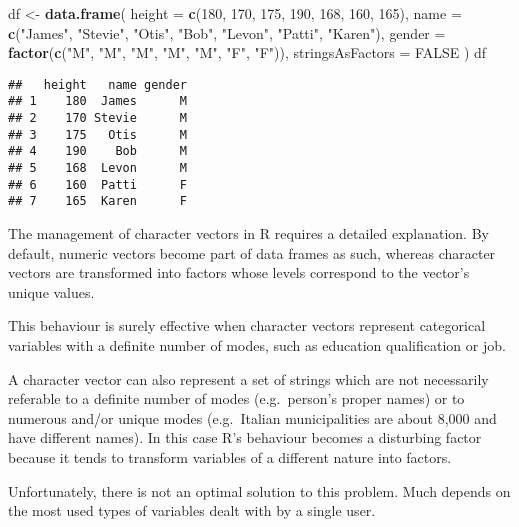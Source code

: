 \documentclass[]{book}
\newenvironment{Shaded}{\begin{snugshade}}{\end{snugshade}}
\newcommand{\KeywordTok}[1]{\textcolor[rgb]{0.13,0.29,0.53}{\textbf{{#1}}}}
\newcommand{\DataTypeTok}[1]{\textcolor[rgb]{0.13,0.29,0.53}{{#1}}}
\newcommand{\DecValTok}[1]{\textcolor[rgb]{0.00,0.00,0.81}{{#1}}}
\newcommand{\StringTok}[1]{\textcolor[rgb]{0.31,0.60,0.02}{{#1}}}
\newcommand{\OtherTok}[1]{\textcolor[rgb]{0.56,0.35,0.01}{{#1}}}
\newcommand{\NormalTok}[1]{{#1}}
\begin{document}
\begin{Shaded}
\begin{Highlighting}[]
\NormalTok{df <-}\StringTok{ }\KeywordTok{data.frame}\NormalTok{(}
  \DataTypeTok{height =} \KeywordTok{c}\NormalTok{(}\DecValTok{180}\NormalTok{, }\DecValTok{170}\NormalTok{, }\DecValTok{175}\NormalTok{, }\DecValTok{190}\NormalTok{, }\DecValTok{168}\NormalTok{, }\DecValTok{160}\NormalTok{, }\DecValTok{165}\NormalTok{),}
  \DataTypeTok{name =} \KeywordTok{c}\NormalTok{(}\StringTok{"James"}\NormalTok{, }\StringTok{"Stevie"}\NormalTok{, }\StringTok{"Otis"}\NormalTok{, }\StringTok{"Bob"}\NormalTok{, }\StringTok{"Levon"}\NormalTok{, }\StringTok{"Patti"}\NormalTok{, }\StringTok{"Karen"}\NormalTok{),}
  \DataTypeTok{gender =} \KeywordTok{factor}\NormalTok{(}\KeywordTok{c}\NormalTok{(}\StringTok{"M"}\NormalTok{, }\StringTok{"M"}\NormalTok{, }\StringTok{"M"}\NormalTok{, }\StringTok{"M"}\NormalTok{, }\StringTok{"M"}\NormalTok{, }\StringTok{"F"}\NormalTok{, }\StringTok{"F"}\NormalTok{)),}
  \DataTypeTok{stringsAsFactors =} \OtherTok{FALSE}
\NormalTok{)}
\NormalTok{df}
\end{Highlighting}
\end{Shaded}

\begin{verbatim}
##   height   name gender
## 1    180  James      M
## 2    170 Stevie      M
## 3    175   Otis      M
## 4    190    Bob      M
## 5    168  Levon      M
## 6    160  Patti      F
## 7    165  Karen      F
\end{verbatim}

The management of character vectors in R requires a detailed
explanation. By default, numeric vectors become part of data frames as
such, whereas character vectors are transformed into factors whose
levels correspond to the vector's unique values.

This behaviour is surely effective when character vectors represent
categorical variables with a definite number of modes, such as education
qualification or job.

A character vector can also represent a set of strings which are not
necessarily referable to a definite number of modes (e.g.~person's
proper names) or to numerous and/or unique modes (e.g.~Italian
municipalities are about 8,000 and have different names). In this case
R's behaviour becomes a disturbing factor because it tends to transform
variables of a different nature into factors.

Unfortunately, there is not an optimal solution to this problem. Much
depends on the most used types of variables dealt with by a single user.
\end{document}
